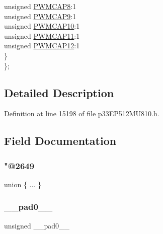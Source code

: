 \begin{DoxyCompactItemize}
\begin{tabbing}
\>\>unsigned \hyperlink{structtag_p_w_m_c_a_p5_b_i_t_s_a01b802d233dbea59cd23996d219e39c9}{PWMCAP8}:1\\
\>\>unsigned \hyperlink{structtag_p_w_m_c_a_p5_b_i_t_s_a9a0cd5d7a58681927adecfd9946b75fb}{PWMCAP9}:1\\
\>\>unsigned \hyperlink{structtag_p_w_m_c_a_p5_b_i_t_s_a765ff5b5b1008d8aeb0359590759bd42}{PWMCAP10}:1\\
\>\>unsigned \hyperlink{structtag_p_w_m_c_a_p5_b_i_t_s_a50c60306a98023b9bb8fac50c8d5e965}{PWMCAP11}:1\\
\>\>unsigned \hyperlink{structtag_p_w_m_c_a_p5_b_i_t_s_a8fec92523cf22c89f156a97aca44dcff}{PWMCAP12}:1\\
\>\} \\
\}; \\

\end{tabbing}\end{DoxyCompactItemize}


\subsection{Detailed Description}


Definition at line 15198 of file p33\+E\+P512\+M\+U810.\+h.



\subsection{Field Documentation}
\mbox{\label{structtag_p_w_m_c_a_p5_b_i_t_s_adf68ee994b002a25ef237241d839ac83}} 
\subsubsection{\texorpdfstring{"@2649}{@2649}}
{\footnotesize\ttfamily union \{ ... \} }

\mbox{\label{structtag_p_w_m_c_a_p5_b_i_t_s_adf71f3d8410c1f1dbbc96680a92c49af}} 
\subsubsection{\texorpdfstring{\+\_\+\+\_\+pad0\+\_\+\+\_\+}{\_\_pad0\_\_}}
{\footnotesize\ttfamily unsigned \+\_\+\+\_\+pad0\+\_\+\+\_\+}



